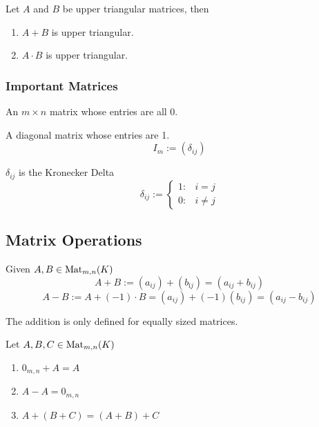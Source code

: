 \begin{proposition}
   Let \(A\) and \(B\) be upper triangular matrices, then
   \begin{enumerate}[label=\roman*, align=Center]
      \item \(A + B\) is upper triangular.
      \item \(A \cdot B\) is upper triangular.
   \end{enumerate}
\end{proposition}

\subsubsection{Important Matrices}
\begin{definition}
   An \(m \times n \) matrix whose entries are all \(0\).
\end{definition}

\begin{definition}
   A diagonal matrix whose entries are 1.
   \[I_m := (\delta_{ij})\]
\end{definition}
\begin{remark}
   \(\delta_{ij}\) is the Kronecker Delta
   \[\delta_{ij} := \begin{cases} 1: & i=j\\ 0: & i \neq j\end{cases}\]
\end{remark}

\subsection{Matrix Operations}
\begin{definition}
   Given \(A, B \in \operatorname{Mat}_{m,n}(K)\)
   \[A + B := (a_{ij}) + (b_{íj}) = (a_{ij} + b_{ij})\]
   \[A - B := A + (-1) \cdot B = (a_{ij}) + (-1)(b_{ij}) = (a_{ij} - b_{ij})\]
\end{definition}
\begin{remark}
   The addition is only defined for equally sized matrices.
\end{remark}

\begin{proposition}
   Let \(A, B, C \in \operatorname{Mat}_{m,n}(K)\)
   \begin{enumerate}[label=\roman*, align=Center]
      \item \(0_{m,n} + A = A\)
      \item \(A - A = 0_{m,n}\)
      \item \(A + (B + C) = (A + B) + C\)
   \end{enumerate}
\end{proposition}

